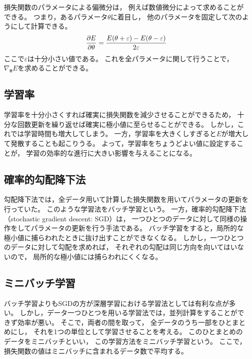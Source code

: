 \documentclass[class=jsarticle, crop=false, dvipdfmx, fleqn]{standalone}
\begin{document}
損失関数のパラメータによる偏微分は，
例えば数値微分によって求めることができる。
つまり，あるパラメータ$\theta$に着目し，
他のパラメータを固定して次のようにして計算できる。
\begin{equation}
\pdv{E}{\theta} = \frac{E(\theta + \varepsilon) - E(\theta - \varepsilon)}{2 \varepsilon}
\end{equation}
ここで$\varepsilon$は十分小さい値である。
これを全パラメータに関して行うことで，
$\nabla_{\bm{\theta}} E$を求めることができる。


\subsection{学習率}


学習率を十分小さくすれば確実に損失関数を減少させることができるため，
十分な回数更新を繰り返せば確実に極小値に至らせることができる。
しかし，これでは学習時間も増大してしまう。
一方，学習率を大きくしすぎると$E$が増大して発散することも起こりうる。
よって，学習率をちょうどよい値に設定することが，
学習の効率的な進行に大きい影響を与えることになる。


\subsection{確率的勾配降下法}

勾配降下法では，全データ用いて計算した損失関数を用いてパラメータの更新を行っていた。
このような学習法をバッチ学習という。
一方，確率的勾配降下法（stochastic gradient descent: SGD）は，
一つひとつのデータに対して同様の操作をしてパラメータの更新を行う手法である。
バッチ学習をすると，局所的な極小値に捕らわれたときに抜け出すことができなくなる。
しかし，一つひとつのデータに対して勾配を求めれば，
それぞれの勾配は同じ方向を向いてはいないので，
局所的な極小値には捕らわれにくくなる。


\subsection{ミニバッチ学習}

バッチ学習よりもSGDの方が深層学習における学習法としては有利な点が多い。
しかし，データ一つひとつを用いる学習法では，並列計算をすることができず効率が悪い。
そこで，両者の間を取って，
全データのうち一部をひとまとめにし，
それを1つの単位として学習させることを考える。
このひとまとめのデータをミニバッチといい，
この学習方法をミニバッチ学習という。
ここで，損失関数の値はミニバッチに含まれるデータ数で平均する。
\end{document}

